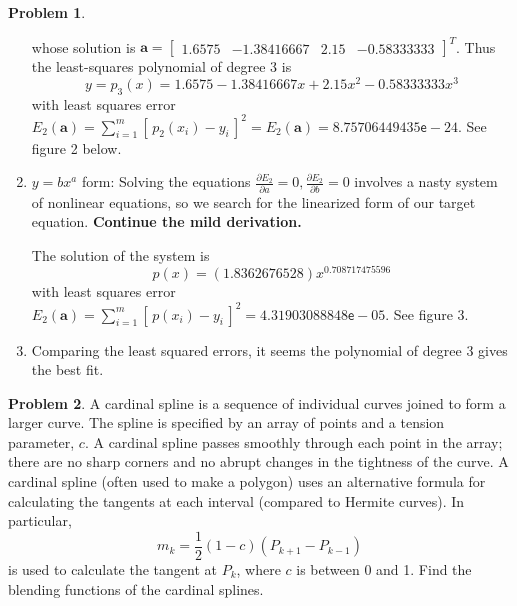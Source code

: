 \documentclass[10pt]{article}
\theoremstyle{plain}
\theoremstyle{definition}
\newtheorem{prob}{Problem}
\numberwithin{equation}{section}
\begin{document}
\begin{prob}
\begin{enumerate}[\bfseries(a)]
\[\]
whose solution is
$\bm{a} = \begin{bmatrix} 1.6575 & -1.38416667 & 2.15 & -0.58333333 \end{bmatrix}^T$. Thus
the least-squares polynomial of degree 3 is
\[
        \boxed{y = p_3(x) = 1.6575  - 1.38416667 x + 2.15 x^2  - 0.58333333 x^3}
\]
        with least squares error
        $E_2(\bm{a}) = \sum_{i=1}^m \left[\, p_2(x_i) - y_i\, \right]^2 =
        E_2(\bm{a})= 8.75706449435 \mathsf{e}-24$.
    See figure 2 below.
\item   $y= bx^a$ form:
    Solving the equations $\frac{\partial E_2}{\partial a} = 0 , \frac{\partial E_2}{\partial b} = 0$
    involves a nasty system of nonlinear equations, so we search for the
    linearized form of our target equation. \textbf{Continue the mild derivation.}

    The solution of the system is
    \[\boxed{p(x) = (1.8362676528) x^{0.708717475596}}\]
    with least squares error
    $E_2(\bm{a}) = \sum_{i=1}^m \left[\, p(x_i) - y_i\, \right]^2 =  4.31903088848\mathsf{e}-05$.
    See figure 3.
\item Comparing the least squared errors, it seems the polynomial of degree 3 gives the best fit.
\end{enumerate}

\end{prob}

\hrulefill
\begin{prob}
    A cardinal spline is a sequence of individual curves joined to form a
    larger curve. The spline is specified by an array of points and a tension
    parameter, $c$. A cardinal spline passes smoothly through each point in the
    array; there are no sharp corners and no abrupt changes in the tightness
    of the curve. A cardinal spline (often used to make a polygon) uses an
    alternative formula for calculating the tangents at each interval
    (compared to Hermite curves). In particular, 
    \[
            m_k = \frac{1}{2}(1-c)\left(P_{k+1} - P_{k-1}\right)
        \]
    is used to calculate the tangent at $P_k$, where $c$ is between 0 and 1.
    Find the blending functions of the cardinal splines.
\end{prob}
\end{document}
